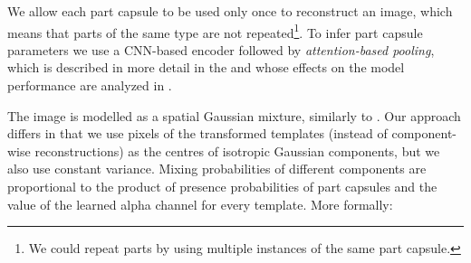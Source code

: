 We allow each part capsule to be used only once to reconstruct an image, which means that parts of the same type are not repeated\footnote{We could repeat parts by using multiple instances of the same part capsule.}.
To infer part capsule parameters we use a \gls{CNN}-based encoder followed by \textit{attention-based pooling}, which is described in more detail in the  and whose effects on the model performance are analyzed in .

The image is modelled as a spatial Gaussian mixture, similarly to \cite{Greff2019multi, Burgess2019monet, Engelcke2019genesis}.
Our approach differs in that we use pixels of the transformed templates (instead of component-wise reconstructions) as the centres of isotropic Gaussian components, but we also use constant variance.
Mixing probabilities of different components are proportional to the product of presence probabilities of part capsules and the value of the learned alpha channel for every template.
More formally:
